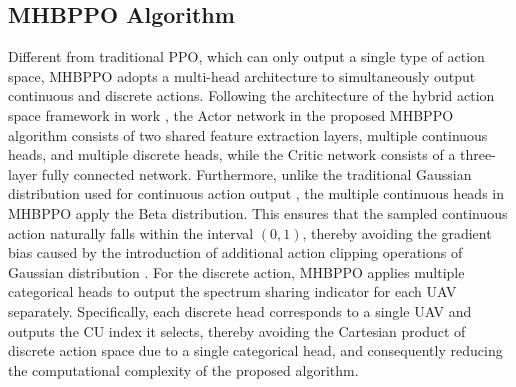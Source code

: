 \documentclass[10pt,journal,compsoc]{IEEEtran}
\begin{document}
\subsection{MHBPPO Algorithm}
Different from traditional PPO, which can only output a single type of action space, MHBPPO adopts a multi-head architecture to simultaneously output continuous and discrete actions.
Following the architecture of the hybrid action space framework in work \cite{c5:IoTJ:HPPO}, the Actor network in the proposed MHBPPO algorithm consists of two shared feature extraction layers, multiple continuous heads, and multiple discrete heads,
while the Critic network consists of a three-layer fully connected network.
Furthermore, unlike the traditional Gaussian distribution used for continuous action output \cite{c5:IoTJ:HPPO}, the multiple continuous heads in MHBPPO apply the Beta distribution. 
This ensures that the sampled continuous action naturally falls within the interval $\left(0, 1 \right)$, thereby avoiding the gradient bias caused by the introduction of additional action clipping operations of Gaussian distribution \cite{c4:Beta-distribution}.
For the discrete action, MHBPPO applies multiple categorical heads to output the spectrum sharing indicator for each UAV separately.
Specifically, each discrete head corresponds to a single UAV and outputs the CU index it selects, thereby avoiding the Cartesian product of discrete action space due to a single categorical head, and consequently reducing the computational complexity of the proposed algorithm.
\end{document}
